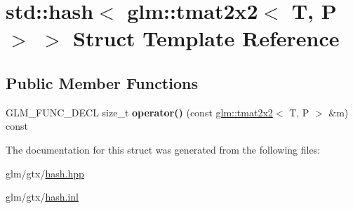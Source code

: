\hypertarget{structstd_1_1hash_3_01glm_1_1tmat2x2_3_01T_00_01P_01_4_01_4}{\section{std\-:\-:hash$<$ glm\-:\-:tmat2x2$<$ T, P $>$ $>$ Struct Template Reference}
\label{structstd_1_1hash_3_01glm_1_1tmat2x2_3_01T_00_01P_01_4_01_4}
}
\subsection*{Public Member Functions}
\begin{DoxyCompactItemize}
\item 
\hypertarget{structstd_1_1hash_3_01glm_1_1tmat2x2_3_01T_00_01P_01_4_01_4_aa17c145c9bb93c9cb2aac290fe42780b}{G\-L\-M\-\_\-\-F\-U\-N\-C\-\_\-\-D\-E\-C\-L size\-\_\-t {\bfseries operator()} (const \hyperlink{structglm_1_1tmat2x2}{glm\-::tmat2x2}$<$ T, P $>$ \&m) const }\label{structstd_1_1hash_3_01glm_1_1tmat2x2_3_01T_00_01P_01_4_01_4_aa17c145c9bb93c9cb2aac290fe42780b}

\end{DoxyCompactItemize}


The documentation for this struct was generated from the following files\-:\begin{DoxyCompactItemize}
\item 
glm/gtx/\hyperlink{hash_8hpp}{hash.\-hpp}\item 
glm/gtx/\hyperlink{hash_8inl}{hash.\-inl}\end{DoxyCompactItemize}
